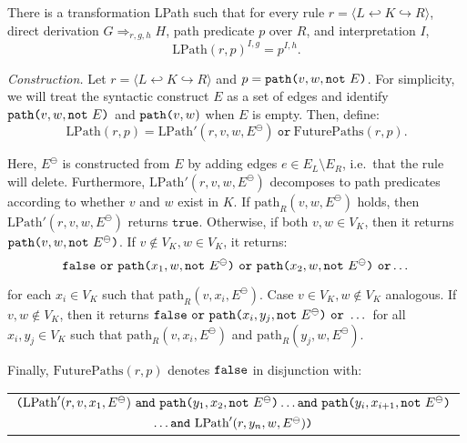 \documentclass{llncs}
\newcommand{\mt}[1]{\text{\tt{#1}}}
\begin{document}
\begin{proposition}\label{prop:LPath}\rm
	There is a transformation LPath such that for every rule $r = \langle L \hookleftarrow K \hookrightarrow R \rangle$, direct derivation $G\Rightarrow_{r,g,h} H$, path predicate $p$ over $R$, and interpretation $I$,
	\[ \text{LPath}(r,p)^{I,g} = p^{I,h}. \]
\end{proposition}

\noindent \emph{Construction.} Let $r = \langle L \hookleftarrow K \hookrightarrow R \rangle$ and $p = \mathtt{path}\mt{(}v,w,\mathtt{not}\ E\mt{)}$. For simplicity, we will treat the syntactic construct $E$ as a set of edges and identify $\mathtt{path}\mt{(}v,w,\mathtt{not}\ E\mt{)}$ and $\mathtt{path}\mt{(}v,w{)}$ when $E$ is empty. Then, define:
\[ \text{LPath}(r,p) = \text{LPath}'(r,v,w,E^\ominus)\ \mathtt{or}\ \text{FuturePaths}(r,p). \]

\noindent Here, $E^\ominus$ is constructed from $E$ by adding edges $e\in E_L\setminus E_R$, i.e.\ that the rule will delete. Furthermore, $\text{LPath}'(r,v,w,E^\ominus)$ decomposes to path predicates according to whether $v$ and $w$ exist in $K$. If $\text{path}_R(v,w,E^\ominus)$ holds, then $\text{LPath}'(r,v,w,E^\ominus)$ returns $\mathtt{true}$. Otherwise, if both $v,w\in V_K$, then it returns $\mathtt{path}\mt{(}v,w,\mathtt{not}\ E^\ominus\mt{)}$. If $v\notin V_K, w\in V_K$, it returns:
\[\mathtt{false\ or}\ \mathtt{path}\mt{(}x_1,w,\mathtt{not}\ E^\ominus\mt{)}\ \mathtt{or}\ \mathtt{path}\mt{(}x_2,w,\mathtt{not}\ E^\ominus\mt{)}\ \mathtt{or}\dots\]

\noindent for each $x_i\in V_K$ such that $\text{path}_R(v,x_i,E^\ominus)$. Case $v\in V_K,w\notin V_K$ analogous. If $v,w\notin V_K$, then it returns $\mathtt{false\ or}\ \mathtt{path}\mt{(}x_i,y_j,\mathtt{not}\ E^\ominus\mt{)}\ \mathtt{or}\ \dots$ for all $x_i,y_j\in V_K$ such that $\text{path}_R(v,x_i,E^\ominus)$ and $\text{path}_R(y_j,w,E^\ominus)$.

Finally, $\text{FuturePaths}(r,p)$ denotes $\tt false$ in disjunction with:
\begin{center}
	\begin{tabular}{c}
		$\mt{(}\text{LPath}'(r,v,x_1,E^\ominus)\ \mathtt{and}\ \mathtt{path}\mt{(}y_1,x_2,\mathtt{not}\ E^\ominus\mt{)} \dots \mathtt{and}\ \mathtt{path}\mt{(}y_i,x_{i+1},\mathtt{not}\ E^\ominus\mt{)}$\\
		$\dots \mathtt{and}\ \text{LPath}'(r,y_n,w,E^\ominus)\mt{)}$
	\end{tabular}
\end{center}
\end{document}
